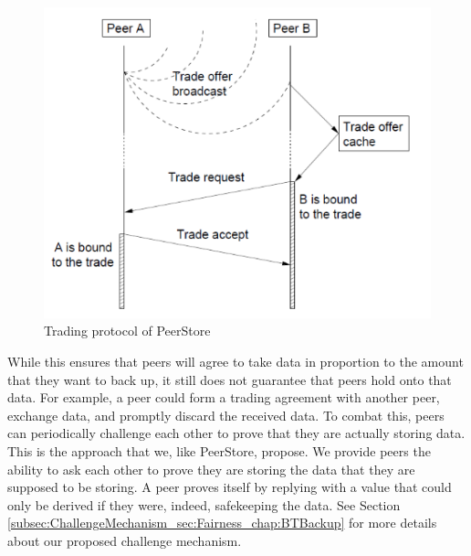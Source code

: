 \documentclass[12pt]{report}
\begin{document}
\begin{figure}
  \centering
  \includegraphics[scale=0.75]{figures/PeerStoreTrading}
  \caption{Trading protocol of PeerStore \cite{PeerStore} \label{fig:peerStoreTrading}}
\end{figure}

While this ensures that peers will agree to take data in proportion to the amount that they want to back up, it still does not guarantee that peers hold onto that data. For example, a peer could form a trading agreement with another peer, exchange data, and promptly discard the received data. To combat this, peers can periodically challenge each other to prove that they are actually storing data. This is the approach that we, like PeerStore, propose. We provide peers the ability to ask each other to prove they are storing the data that they are supposed to be storing. A peer proves itself by replying with a value that could only be derived if they were, indeed, safekeeping the data. See Section \ref{subsec:ChallengeMechanism_sec:Fairness_chap:BTBackup}
 for more details about our proposed challenge mechanism.
\end{document}

